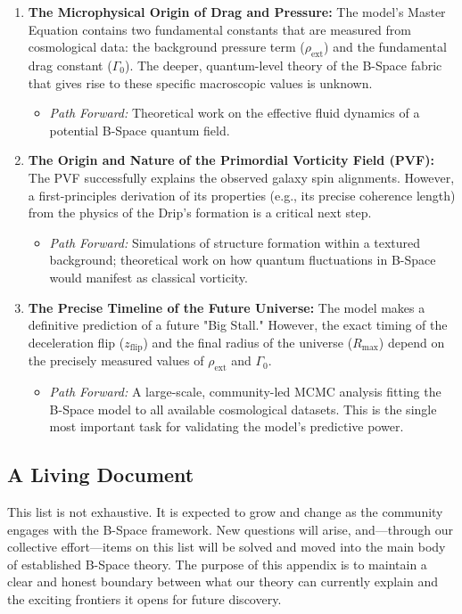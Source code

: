 \documentclass{BSpacePaper} %
\begin{document}
\begin{appendices}
\begin{enumerate}
    \item \textbf{The Microphysical Origin of Drag and Pressure:} The model's Master Equation contains two fundamental constants that are measured from cosmological data: the background pressure term ($\rho_{\text{ext}}$) and the fundamental drag constant ($\Gamma_0$). The deeper, quantum-level theory of the B-Space fabric that gives rise to these specific macroscopic values is unknown.
    \begin{itemize}
        \item \textit{Path Forward:} Theoretical work on the effective fluid dynamics of a potential B-Space quantum field.
    \end{itemize}

    \item \textbf{The Origin and Nature of the Primordial Vorticity Field (PVF):} The PVF successfully explains the observed galaxy spin alignments. However, a first-principles derivation of its properties (e.g., its precise coherence length) from the physics of the Drip's formation is a critical next step.
    \begin{itemize}
        \item \textit{Path Forward:} Simulations of structure formation within a textured background; theoretical work on how quantum fluctuations in B-Space would manifest as classical vorticity.
    \end{itemize}

    \item \textbf{The Precise Timeline of the Future Universe:} The model makes a definitive prediction of a future "Big Stall." However, the exact timing of the deceleration flip ($z_{\text{flip}}$) and the final radius of the universe ($R_{\text{max}}$) depend on the precisely measured values of $\rho_{\text{ext}}$ and $\Gamma_0$.
    \begin{itemize}
        \item \textit{Path Forward:} A large-scale, community-led MCMC analysis fitting the B-Space model to all available cosmological datasets. This is the single most important task for validating the model's predictive power.
    \end{itemize}
\end{enumerate}

\subsection{A Living Document}
This list is not exhaustive. It is expected to grow and change as the community engages with the B-Space framework. New questions will arise, and—through our collective effort—items on this list will be solved and moved into the main body of established B-Space theory. The purpose of this appendix is to maintain a clear and honest boundary between what our theory can currently explain and the exciting frontiers it opens for future discovery.


\end{appendices}
\end{document}

